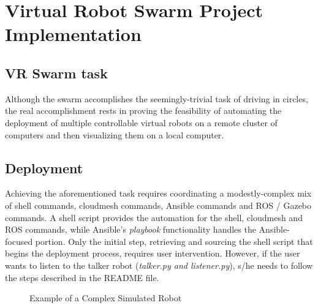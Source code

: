 \documentclass[9pt,twocolumn,twoside]{../../styles/osajnl}
\begin{document}
\section{Virtual Robot Swarm Project Implementation}
\subsection{VR Swarm task}
Although the swarm accomplishes the seemingly-trivial task of driving in circles, the real accomplishment rests in proving the feasibility of automating the deployment of multiple controllable virtual robots on a remote cluster of computers and then visualizing them on a local computer.

\subsection{Deployment}
Achieving the aforementioned task requires coordinating a modestly-complex mix of shell commands, cloudmesh commands, Ansible commands and ROS / Gazebo commands. A shell script provides the automation for the shell, cloudmesh and ROS commands, while Ansible's \textit{playbook} functionality handles the Ansible-focused portion.  Only the initial step, retrieving and sourcing the shell script that begins the deployment process, requires user intervention.  However, if the user wants to listen to the talker robot (\textit{talker.py and listener.py}), s/he needs to follow the steps described in the README file.

\begin{figure}[htbp]
\centering
{}
\caption{Example of a Complex Simulated Robot}
\label{fig:complexRobot}
\end{figure}
\end{document}
